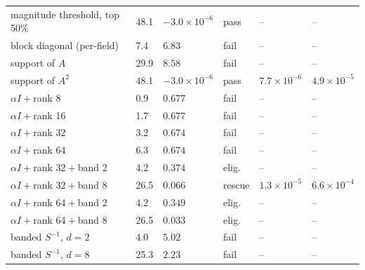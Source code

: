 \begin{table}
\begin{tabular}{llllll}
magnitude threshold, top 50\% & 48.1 & $-3.0\times10^{-6}$ & pass & -- & -- \\
block diagonal (per-field) & 7.4 & $6.83$ & fail & -- & -- \\
support of $A$ & 29.9 & $8.58$ & fail & -- & -- \\
support of $A^{2}$ & 48.1 & $-3.0\times10^{-6}$ & pass & $7.7\times10^{-6}$ & $4.9\times10^{-5}$ \\
$\alpha I+{}$rank 8 & 0.9 & $0.677$ & fail & -- & -- \\
$\alpha I+{}$rank 16 & 1.7 & $0.677$ & fail & -- & -- \\
$\alpha I+{}$rank 32 & 3.2 & $0.674$ & fail & -- & -- \\
$\alpha I+{}$rank 64 & 6.3 & $0.674$ & fail & -- & -- \\
$\alpha I+{}$rank 32${}+{}$band 2 & 4.2 & $0.374$ & elig. & -- & -- \\
$\alpha I+{}$rank 32${}+{}$band 8 & 26.5 & $0.066$ & rescue & $1.3\times10^{-5}$ & $6.6\times10^{-4}$ \\
$\alpha I+{}$rank 64${}+{}$band 2 & 4.2 & $0.349$ & elig. & -- & -- \\
$\alpha I+{}$rank 64${}+{}$band 8 & 26.5 & $0.033$ & elig. & -- & -- \\
banded $S^{-1}$, $d=2$ & 4.0 & $5.02$ & fail & -- & -- \\
banded $S^{-1}$, $d=8$ & 25.3 & $2.23$ & fail & -- & -- \\
\bottomrule
\end{tabular}
\end{table}

